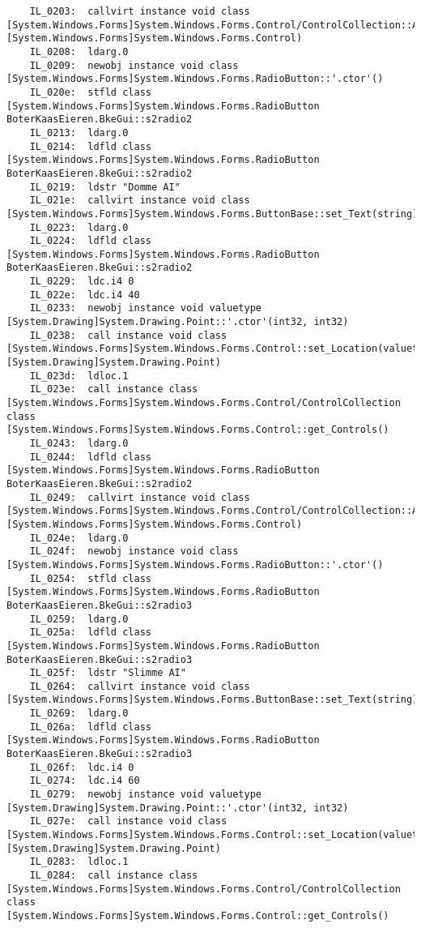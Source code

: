 \begin{lstlisting}
	IL_0203:  callvirt instance void class [System.Windows.Forms]System.Windows.Forms.Control/ControlCollection::Add(class [System.Windows.Forms]System.Windows.Forms.Control)
	IL_0208:  ldarg.0 
	IL_0209:  newobj instance void class [System.Windows.Forms]System.Windows.Forms.RadioButton::'.ctor'()
	IL_020e:  stfld class [System.Windows.Forms]System.Windows.Forms.RadioButton BoterKaasEieren.BkeGui::s2radio2
	IL_0213:  ldarg.0 
	IL_0214:  ldfld class [System.Windows.Forms]System.Windows.Forms.RadioButton BoterKaasEieren.BkeGui::s2radio2
	IL_0219:  ldstr "Domme AI"
	IL_021e:  callvirt instance void class [System.Windows.Forms]System.Windows.Forms.ButtonBase::set_Text(string)
	IL_0223:  ldarg.0 
	IL_0224:  ldfld class [System.Windows.Forms]System.Windows.Forms.RadioButton BoterKaasEieren.BkeGui::s2radio2
	IL_0229:  ldc.i4 0
	IL_022e:  ldc.i4 40
	IL_0233:  newobj instance void valuetype [System.Drawing]System.Drawing.Point::'.ctor'(int32, int32)
	IL_0238:  call instance void class [System.Windows.Forms]System.Windows.Forms.Control::set_Location(valuetype [System.Drawing]System.Drawing.Point)
	IL_023d:  ldloc.1 
	IL_023e:  call instance class [System.Windows.Forms]System.Windows.Forms.Control/ControlCollection class [System.Windows.Forms]System.Windows.Forms.Control::get_Controls()
	IL_0243:  ldarg.0 
	IL_0244:  ldfld class [System.Windows.Forms]System.Windows.Forms.RadioButton BoterKaasEieren.BkeGui::s2radio2
	IL_0249:  callvirt instance void class [System.Windows.Forms]System.Windows.Forms.Control/ControlCollection::Add(class [System.Windows.Forms]System.Windows.Forms.Control)
	IL_024e:  ldarg.0 
	IL_024f:  newobj instance void class [System.Windows.Forms]System.Windows.Forms.RadioButton::'.ctor'()
	IL_0254:  stfld class [System.Windows.Forms]System.Windows.Forms.RadioButton BoterKaasEieren.BkeGui::s2radio3
	IL_0259:  ldarg.0 
	IL_025a:  ldfld class [System.Windows.Forms]System.Windows.Forms.RadioButton BoterKaasEieren.BkeGui::s2radio3
	IL_025f:  ldstr "Slimme AI"
	IL_0264:  callvirt instance void class [System.Windows.Forms]System.Windows.Forms.ButtonBase::set_Text(string)
	IL_0269:  ldarg.0 
	IL_026a:  ldfld class [System.Windows.Forms]System.Windows.Forms.RadioButton BoterKaasEieren.BkeGui::s2radio3
	IL_026f:  ldc.i4 0
	IL_0274:  ldc.i4 60
	IL_0279:  newobj instance void valuetype [System.Drawing]System.Drawing.Point::'.ctor'(int32, int32)
	IL_027e:  call instance void class [System.Windows.Forms]System.Windows.Forms.Control::set_Location(valuetype [System.Drawing]System.Drawing.Point)
	IL_0283:  ldloc.1 
	IL_0284:  call instance class [System.Windows.Forms]System.Windows.Forms.Control/ControlCollection class [System.Windows.Forms]System.Windows.Forms.Control::get_Controls()

\end{lstlisting}
